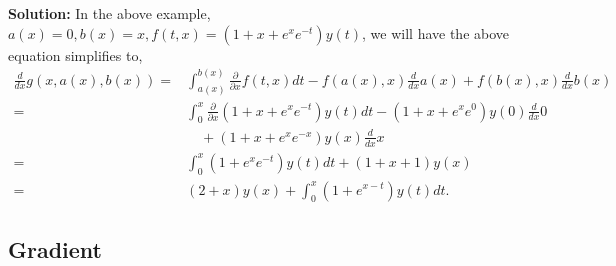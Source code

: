 \documentclass[13pt]{article}
\theoremstyle{definition}
\newenvironment{solution}
{\color{C2}\begin{framed}\begingroup\textbf{Solution:} }
  {\endgroup\end{framed}}
\theoremstyle{remark}
\begin{document}
\begin{solution}
    In the above example, $a(x)=0, b(x)=x, f(t, x)=\left(1+x+e^x e^{-t}\right) y(t)$, we will have the above equation simplifies to,
\begin{align*}
\frac{d}{d x} g\left(x,a(x),b(x) \right) = & \int_{a(x)}^{b(x)}{\frac{\partial}{\partial x} f(t,x) dt }  - f\left(a(x),x\right) \frac{d}{d x} a(x) +  f\left(b(x),x\right) \frac{d}{d x} b(x)  \\
=&  \int_{0}^{x}{\frac{\partial}{\partial x} \left( 1+x+ e^{x}  e^{-t} \right) y(t)   dt }  - \left(1+x+ e^{x}  e^{0} \right) y(0)   \frac{d}{d x} 0\\
&\quad +  \left(1+x+ e^{x}  e^{-x}\right) y(x)   \frac{d}{d x} x  \\
=&  \int_{0}^{x}{ \left( 1+ e^{x}  e^{-t} \right) y(t)   dt }+  \left(1+x +1\right) y(x)  \\ 
=&  \left(2+x\right) y(x) +   \int_{0}^{x}{ \left( 1+ e^{x-t}  \right) y(t)   dt }.
\end{align*}
\end{solution}

\subsection{Gradient}
\end{document}
